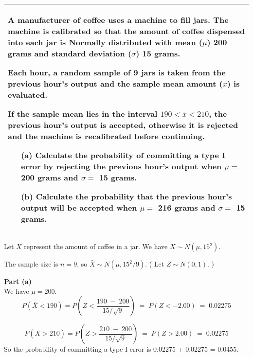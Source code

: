 \documentclass[a4paper,12pt]{article}
\begin{document}
 
\newpage
\begin{table}[ht!]
 
\centering
 
\begin{tabular}{|p{15cm}|}
 
\hline  

 \large
\noindent A manufacturer of coffee uses a machine to fill jars.  The machine is calibrated so that the amount of coffee dispensed into each jar is Normally distributed with mean ($\mu$) 200 grams and standard deviation ($\sigma$) 15 grams. 


Each hour, a random sample of 9 jars is taken from the previous hour's output and the sample mean amount ($\bar{x}$) is evaluated.  


If the sample mean lies in the interval $190 < \bar{x} < 210$, the previous hour's output is accepted, otherwise it is rejected and the machine is recalibrated before continuing. 
 
 \begin{itemize}
     \item[(a)] Calculate the probability of committing a type I error by rejecting the previous hour's output when $\mu = $ 200 grams and $\sigma  =$ 15 grams. 
 
\item[(b)] Calculate the probability that the previous hour's output will be accepted when $\mu = $ 216 grams and $\sigma  =$  15 grams. 
 
 \end{itemize}

\\ \hline

\end{tabular}

\end{table} 

\large 
\noindent  Let $X$ represent the amount of coffee in a jar.  We have $X \sim N( \mu , 15^2)$.  

\noindent  The sample size is $n = 9$, so $\bar{X} \sim N( \mu , 15^2/9)$. ( Let $Z \sim N(0, 1)$. )
 
\noindent \textbf{Part (a)}\\ 
\noindent We have $\mu  = 200$. 
 \[ P \left( \bar{X} < 190 \right) = P \left( Z <  \frac{190 \;-\; 200}{ 15/\sqrt{9} } \right) \;=\; P( Z <-2.00) \;=\; 0.02275 \]

\[ P \left( \bar{X} > 210 \right) = P \left( Z >  \frac{210 \;-\; 200}{ 15/\sqrt{9} } \right) \;=\; P( Z > 2.00) \;=\; 0.02275 \]
 So the probability of committing a type I error is 0.02275 + 0.02275 = 0.0455. 
 
\end{document}
